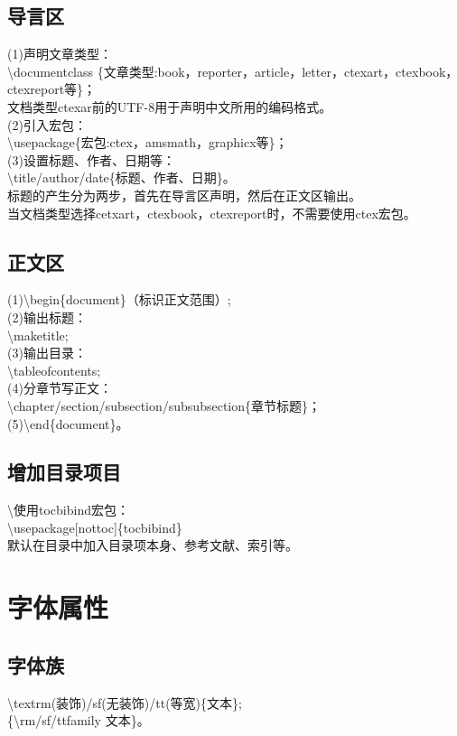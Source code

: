 \documentclass{book}%
\begin{document}
	\section{导言区}
	(1)声明文章类型：\\
	\textbackslash documentclass \{文章类型:book，reporter，article，letter，ctexart，ctexbook，ctexreport等\}；\\
	文档类型ctexar前的UTF-8用于声明中文所用的编码格式。\\
	(2)引入宏包：\\
	\textbackslash usepackage\{宏包:ctex，amsmath，graphicx等\}；\\
	(3)设置标题、作者、日期等：\\
	\textbackslash title/author/date\{标题、作者、日期\}。\\
	标题的产生分为两步，首先在导言区声明，然后在正文区输出。\\
	当文档类型选择cetxart，ctexbook，ctexreport时，不需要使用ctex宏包。
	
	\section{正文区}
	(1)\textbackslash begin\{document\}（标识正文范围）;\\
	(2)输出标题：\\
	\textbackslash maketitle;\\
	(3)输出目录：\\
	\textbackslash tableofcontents;\\
    (4)分章节写正文：\\
    \textbackslash chapter/section/subsection/subsubsection\{章节标题\}；\\
    (5)\textbackslash end\{document\}。
          
    \section{增加目录项目}
    \textbackslash 使用tocbibind宏包：\\
    \textbackslash usepackage[nottoc]\{tocbibind\}\\
    默认在目录中加入目录项本身、参考文献、索引等。\\
    
    \chapter{字体属性}
    
    \section{字体族}
    \textbackslash textrm(装饰)/sf(无装饰)/tt(等宽)\{文本\};\\
    \{\textbackslash rm/sf/ttfamily 文本\}。
    
\end{document}
